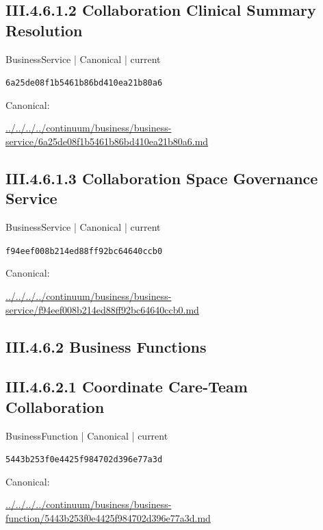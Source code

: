 \documentclass[10pt,a4paper]{article}
\begin{document}
\subsection*{III.4.6.1.2 Collaboration Clinical Summary Resolution}
{\small BusinessService | Canonical | current}\par
\texttt{6a25de08f1b5461b86bd410ea21b80a6}\par
Canonical: \par
{\footnotesize\url{../../../../continuum/business/business-service/6a25de08f1b5461b86bd410ea21b80a6.md}}\par
\subsection*{III.4.6.1.3 Collaboration Space Governance Service}
{\small BusinessService | Canonical | current}\par
\texttt{f94eef008b214ed88ff92bc64640ccb0}\par
Canonical: \par
{\footnotesize\url{../../../../continuum/business/business-service/f94eef008b214ed88ff92bc64640ccb0.md}}\par
\subsection*{III.4.6.2 Business Functions}
\subsection*{III.4.6.2.1 Coordinate Care-Team Collaboration}
{\small BusinessFunction | Canonical | current}\par
\texttt{5443b253f0e4425f984702d396e77a3d}\par
Canonical: \par
{\footnotesize\url{../../../../continuum/business/business-function/5443b253f0e4425f984702d396e77a3d.md}}\par
\end{document}
